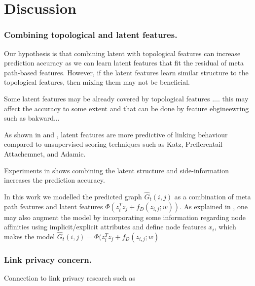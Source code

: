\section{Discussion}



\subsubsection{Combining topological and latent features.}


Our hypothesis is that combining latent with topological features can increase prediction accuracy as we can learn latent features that fit the residual of meta path-based features. However, if the latent features learn similar structure to the topological features, then mixing them may not be beneficial. 

Some latent features may be already covered by topological features .... this may affect the accuracy to some extent and that can be done by feature ebgineewring such as bakward... 

As shown in \cite{menon2011link} and \cite{Zhu2016}, latent features are more predictive of linking behaviour compared to unsupervised scoring techniques such as Katz, Prefferentail Attachemnet, and Adamic.

Experiments in \cite{menon2011link} shows combining the latent structure and side-information increases the prediction accuracy.


In this work we modelled the predicted graph $ \hat{G}_t(i,j)$ as a combination of meta path features and latent features $\Phi(z_{i}^Tz_{j} + f_D(z_{i,j};w))$. As explained in \cite{menon2011link}, one may also augment the model by incorporating some information regarding node affinities using implicit/explicit attributes and define node features $x_i$, which makes the model $\hat{G}_t(i,j) = \Phi(z_{i}^Tz_{j} + f_D(z_{i,j};w)$


\subsubsection{Link privacy concern.}

Connection to link privacy research such as \cite{amin:wwwj}

